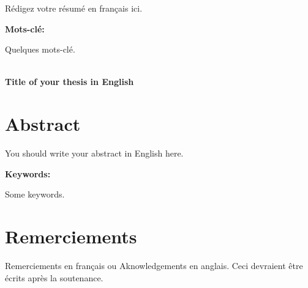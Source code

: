 \documentclass[12pt]{LHSV_thesis}
\begin{document}
Rédigez votre résumé en français ici.
\vspace*{28pt}\par
\textbf{Mots-clé:}\par
Quelques mots-clé.
\par
\clearpage

\begin{center}
~\vspace{6.0cm}\\
\thispagestyle{plain}
\Huge \textbf{Title of your thesis in English}
\vspace*{\fill}
\clearpage
\end{center}

\section*{\Huge Abstract}
%
\vspace{2cm}

You should write your abstract in English here.
\vspace*{28pt}\par
\textbf{Keywords:}\par
Some keywords.
\par
\cleardoublepage

\section*{\Huge Remerciements}
%
\vspace{2cm}

Remerciements en français ou  Aknowledgements en anglais. Ceci devraient être écrits après la soutenance.

\clearpage


\tableofcontents
\clearpage





\end{document}
